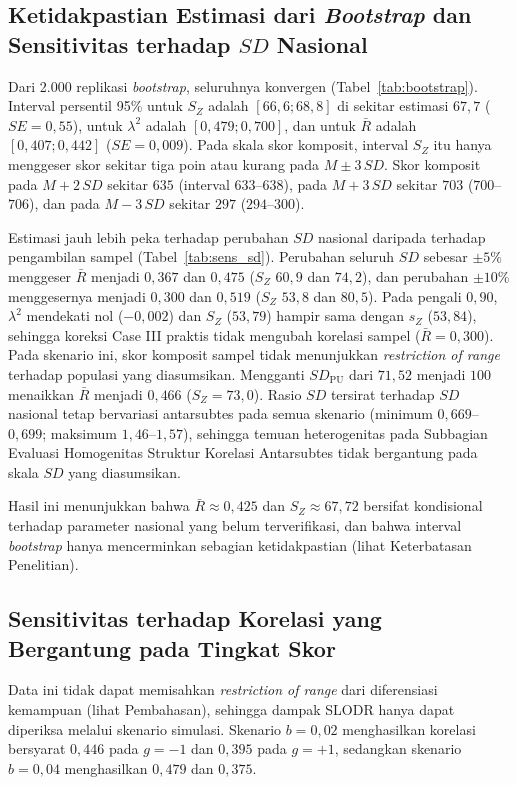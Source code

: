 \subsection{Ketidakpastian Estimasi dari \textit{Bootstrap} dan Sensitivitas terhadap $SD$ Nasional}
Dari 2.000 replikasi \textit{bootstrap}, seluruhnya konvergen (Tabel~\ref{tab:bootstrap}). Interval persentil 95\% untuk $S_Z$ adalah $[66,6; 68,8]$ di sekitar estimasi $67,7$ ($SE = 0,55$), untuk $\lambda^2$ adalah $[0,479; 0,700]$, dan untuk $\bar{R}$ adalah $[0,407; 0,442]$ ($SE = 0,009$). Pada skala skor komposit, interval $S_Z$ itu hanya menggeser skor sekitar tiga poin atau kurang pada $M \pm 3\,SD$. Skor komposit pada $M + 2\,SD$ sekitar $635$ (interval $633$--$638$), pada $M + 3\,SD$ sekitar $703$ ($700$--$706$), dan pada $M - 3\,SD$ sekitar $297$ ($294$--$300$).



Estimasi jauh lebih peka terhadap perubahan $SD$ nasional daripada terhadap pengambilan sampel (Tabel~\ref{tab:sens_sd}). Perubahan seluruh $SD$ sebesar $\pm 5\%$ menggeser $\bar{R}$ menjadi $0,367$ dan $0,475$ ($S_Z$ $60,9$ dan $74,2$), dan perubahan $\pm 10\%$ menggesernya menjadi $0,300$ dan $0,519$ ($S_Z$ $53,8$ dan $80,5$). Pada pengali $0,90$, $\lambda^2$ mendekati nol ($-0,002$) dan $S_Z$ ($53,79$) hampir sama dengan $s_Z$ ($53,84$), sehingga koreksi Case III praktis tidak mengubah korelasi sampel ($\bar{R} = 0,300$). Pada skenario ini, skor komposit sampel tidak menunjukkan \textit{restriction of range} terhadap populasi yang diasumsikan. Mengganti $SD_{\text{PU}}$ dari $71,52$ menjadi $100$ menaikkan $\bar{R}$ menjadi $0,466$ ($S_Z = 73,0$). Rasio $SD$ tersirat terhadap $SD$ nasional tetap bervariasi antarsubtes pada semua skenario (minimum $0,669$--$0,699$; maksimum $1,46$--$1,57$), sehingga temuan heterogenitas pada Subbagian Evaluasi Homogenitas Struktur Korelasi Antarsubtes tidak bergantung pada skala $SD$ yang diasumsikan.

Hasil ini menunjukkan bahwa $\bar{R} \approx 0,425$ dan $S_Z \approx 67,72$ bersifat kondisional terhadap parameter nasional yang belum terverifikasi, dan bahwa interval \textit{bootstrap} hanya mencerminkan sebagian ketidakpastian (lihat Keterbatasan Penelitian).



\subsection{Sensitivitas terhadap Korelasi yang Bergantung pada Tingkat Skor}
Data ini tidak dapat memisahkan \textit{restriction of range} dari diferensiasi kemampuan (lihat Pembahasan), sehingga dampak SLODR hanya dapat diperiksa melalui skenario simulasi. Skenario $b = 0,02$ menghasilkan korelasi bersyarat $0,446$ pada $g = -1$ dan $0,395$ pada $g = +1$, sedangkan skenario $b = 0,04$ menghasilkan $0,479$ dan $0,375$.

